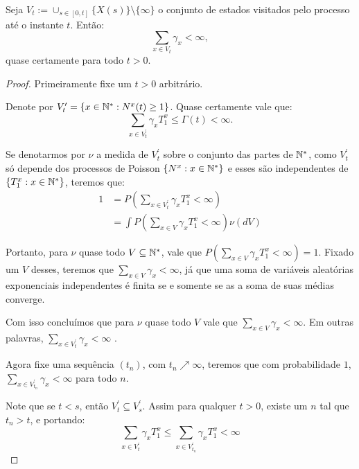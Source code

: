 \begin{proposicao}
  \label{prop:gamma-somavel}
  Seja $V_t := \cup_{s \in [0, t]} \{ X(s) \} \setminus \{\infty\}$ o
  conjunto de estados visitados pelo processo até o instante
  $t$. Então:
  \begin{displaymath}
    \sum_{x \in V_t} \gamma_x < \infty,
  \end{displaymath}
  quase certamente para todo $t > 0$.
\end{proposicao}
\begin{proof}

  Primeiramente fixe um $t > 0$ arbitrário.

  Denote por $V^\prime_t = \{ x \in {\mathbb{N^*}}: N^x(t) \geq 1 \}$. Quase
  certamente vale que:
  \begin{displaymath}
    \sum_{x \in V^\prime_t} \gamma_x T^x_1 \leq \Gamma(t) < \infty.
  \end{displaymath}

  Se denotarmos por $\nu$ a medida de $V^\prime_t$ sobre o conjunto
  das partes de ${\mathbb{N^*}}$, como $V^\prime_t$ só depende dos processos de
  Poisson $\{N^x: x \in {\mathbb{N^*}}\}$ e esses são independentes de $\{ T^x_1:
  x \in {\mathbb{N^*}} \}$, teremos que:
  \begin{align*}
    1 &= P\left(\sum_{x \in V^\prime_t} \gamma_x T^x_1 < \infty
    \right)\\
    &=\int P\left(\sum_{x \in V} \gamma_x T^x_1 < \infty
    \right) \nu(dV)
  \end{align*}

  Portanto, para $\nu$ quase todo $V \subseteq {\mathbb{N^*}}$, vale que
  $P(\sum_{x \in V} \gamma_x T^x_1 < \infty) = 1$. Fixado um
  $V$ desses, teremos que $\sum_{x \in V}\gamma_x < \infty$, já que
  uma soma de variáveis aleatórias exponenciais independentes é finita
  \qc se e somente se as a soma de suas médias converge.

  Com isso concluímos que para $\nu$ quase todo $V$ vale que $\sum_{x
    \in V}\gamma_x < \infty$. Em outras palavras, $\sum_{x \in
    V^\prime_t}\gamma_x < \infty$ \qc.

  Agora fixe uma sequência $(t_n)$, com $t_n\nearrow \infty$, teremos
  que com probabilidade $1$, $\sum_{x \in V^\prime_{t_n}}\gamma_x <
  \infty$ para todo $n$.

  Note que se $t < s$, então $V^\prime_t \subseteq V^\prime_s$. Assim
  para qualquer $t > 0$, existe um $n$ tal que $t_n > t$, e portando:
  \begin{displaymath}
    \sum_{x \in V^\prime_t}\gamma_x T^x_1 \leq
    \sum_{x \in V^\prime_{t_n}}\gamma_x T^x_1 < \infty
  \end{displaymath}


\end{proof}

